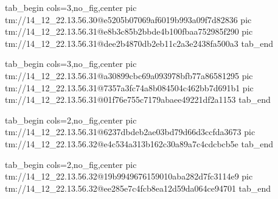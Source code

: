  
 
 
 
 

\qqSecCmtScr


\ifcmt
  tab_begin cols=3,no_fig,center
    pic tm://14_12_22.13.56.30@e5205b07069af6019b993a09f7d82836
    pic tm://14_12_22.13.56.31@e8b3c85b2bbde4b100fbaa752985f290
    pic tm://14_12_22.13.56.31@dee2b4870db2eb11c2a3e2438fa500a3
  tab_end
\fi


\ifcmt
  tab_begin cols=3,no_fig,center
    pic tm://14_12_22.13.56.31@a30899cbc69a093978bfb77a86581295
    pic tm://14_12_22.13.56.31@7357a3fc74a8b084504c462bb7d691b1
    pic tm://14_12_22.13.56.31@01f76e755c7179abaee49221df2a1153
  tab_end
\fi


\ifcmt
  tab_begin cols=2,no_fig,center
    pic tm://14_12_22.13.56.31@6237dbdeb2ae03bd79d66d3ccfda3673
    pic tm://14_12_22.13.56.32@e4c534a313b162c30a89a7c4cdcbcb5e
  tab_end
\fi


\ifcmt
  tab_begin cols=2,no_fig,center
    pic tm://14_12_22.13.56.32@19b9949676159010aba282d7fc3114e9
    pic tm://14_12_22.13.56.32@ee285e7c4fcb8ea12d59da064ce94701
  tab_end
\fi

